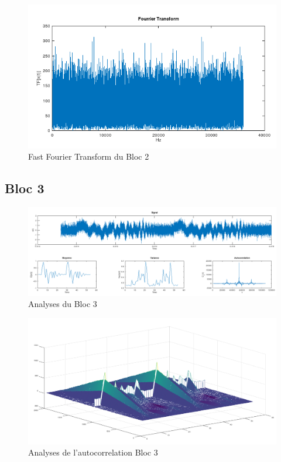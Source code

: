 \documentclass[french, a4paper, 12pt, openany]{book}
\begin{document}
	\begin{figure}[ht]
		\begin{center}
		\includegraphics[scale=0.25]{images/TFBloc2.png}
		\end{center}
		\caption{Fast Fourier Transform du Bloc 2}
		\label{Fast Fourier Transform du Bloc 2}
	\end{figure}

  \subsection{Bloc 3}

	\begin{figure}[ht]
		\begin{center}
		\includegraphics[scale=0.25]{images/SignalBloc3.png}
		\end{center}
		\caption{Analyses du Bloc 3}
		\label{Analyses du Bloc 3}
	\end{figure}

	\begin{figure}[ht]
		\begin{center}
		\includegraphics[scale=0.25]{images/AutoCorrBloc3.png}
		\end{center}
		\caption{Analyses de l'autocorrelation Bloc 3}
		\label{Analyses de l'autocorrelation Bloc 3}
	\end{figure}
\end{document}
